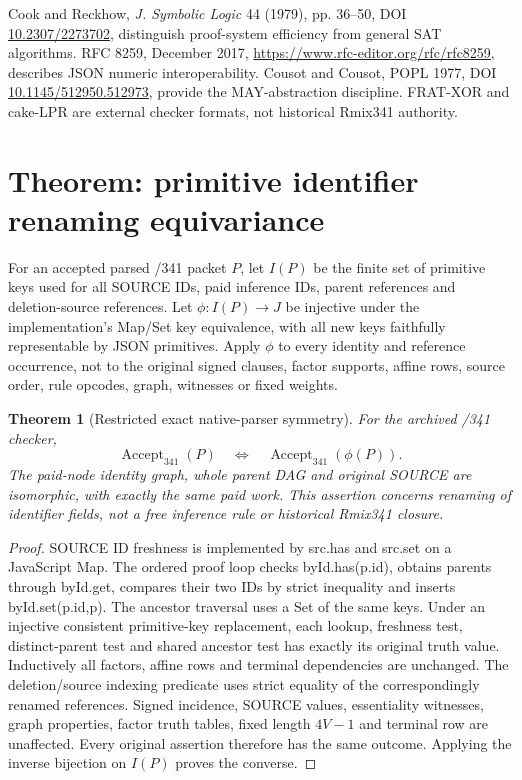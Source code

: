 \documentclass[11pt]{article}
\newtheorem{theorem}{Theorem}
\begin{document}
Cook and Reckhow, \emph{J. Symbolic Logic} 44 (1979), pp. 36--50, DOI \href{https://doi.org/10.2307/2273702}{10.2307/2273702}, distinguish proof-system efficiency from general SAT algorithms. RFC 8259, December 2017, \url{https://www.rfc-editor.org/rfc/rfc8259}, describes JSON numeric interoperability. Cousot and Cousot, POPL 1977, DOI \href{https://doi.org/10.1145/512950.512973}{10.1145/512950.512973}, provide the MAY-abstraction discipline. FRAT-XOR and cake-LPR are external checker formats, not historical Rmix341 authority.

\section*{Theorem: primitive identifier renaming equivariance}
For an accepted parsed /341 packet $P$, let $I(P)$ be the finite set of primitive keys used for all SOURCE IDs, paid inference IDs, parent references and deletion-source references. Let $\phi:I(P)\to J$ be injective under the implementation's Map/Set key equivalence, with all new keys faithfully representable by JSON primitives. Apply $\phi$ to every identity and reference occurrence, not to the original signed clauses, factor supports, affine rows, source order, rule opcodes, graph, witnesses or fixed weights.

\begin{theorem}[Restricted exact native-parser symmetry]
For the archived /341 checker,
\[
 \operatorname{Accept}_{341}(P)
 \quad\Longleftrightarrow\quad
 \operatorname{Accept}_{341}(\phi(P)).
\]
The paid-node identity graph, whole parent DAG and original SOURCE are isomorphic, with exactly the same paid work. This assertion concerns renaming of identifier \emph{fields}, not a free inference rule or historical Rmix341 closure.
\end{theorem}
\begin{proof}
SOURCE ID freshness is implemented by src.has and src.set on a JavaScript Map. The ordered proof loop checks byId.has(p.id), obtains parents through byId.get, compares their two IDs by strict inequality and inserts byId.set(p.id,p). The ancestor traversal uses a Set of the same keys. Under an injective consistent primitive-key replacement, each lookup, freshness test, distinct-parent test and shared ancestor test has exactly its original truth value. Inductively all factors, affine rows and terminal dependencies are unchanged. The deletion/source indexing predicate uses strict equality of the correspondingly renamed references. Signed incidence, SOURCE values, essentiality witnesses, graph properties, factor truth tables, fixed length $4V-1$ and terminal row are unaffected. Every original assertion therefore has the same outcome. Applying the inverse bijection on $I(P)$ proves the converse.
\end{proof}
\end{document}
